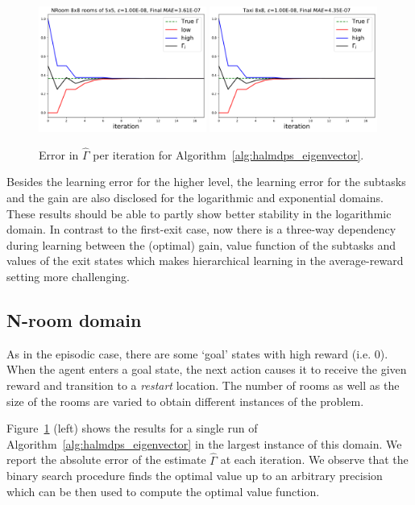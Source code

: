 \begin{figure}[!ht]
  \centering
  \includegraphics*[width=0.49\textwidth]{figures/chapter2/eigenvectors/lmdp-nroom-3.pdf}
  \includegraphics*[width=0.49\textwidth]{figures/chapter2/eigenvectors/lmdp-taxi-8.pdf}
  \caption{Error in $\widehat\Gamma$ per iteration for Algorithm~\ref{alg:halmdps_eigenvector}.}
  \label{fig:halmdps_eigenvectos}
 \end{figure}

Besides the learning error for the higher level, the learning error for the subtasks and the gain are also disclosed for the logarithmic and exponential domains. These results should be able to partly show better stability in the logarithmic domain. In contrast to the first-exit case, now there is a three-way dependency during learning between the (optimal) gain, value function of the subtasks and values of the exit states which makes hierarchical learning in the average-reward setting more challenging.  

  \subsection{N-room domain}
 As in the episodic case, there are some `goal' states with high reward (i.e. $0$). When the agent enters a goal state, the next action causes it to receive the given reward and transition to a {\it restart\/} location. The number of rooms as well as the size of the rooms are varied to obtain different instances of the problem.   
 
 Figure~\ref{fig:halmdps_eigenvectos} (left) shows the results for a single run of Algorithm~\ref{alg:halmdps_eigenvector} in the largest instance of this domain. We report the absolute error of the estimate $\widehat\Gamma$ at each iteration. We observe that the binary search procedure finds the optimal value up to an arbitrary precision which can be then used to compute the optimal value function. 
 

